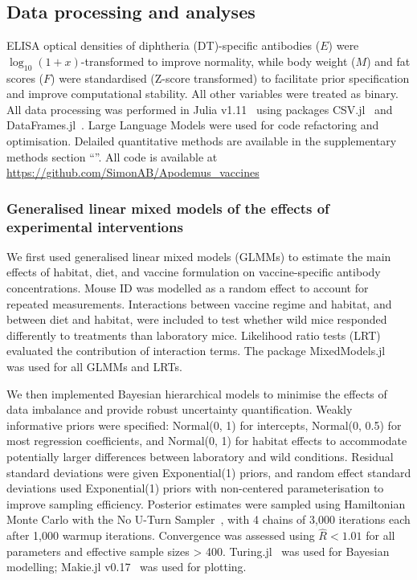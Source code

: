 \documentclass[a4paper, hidelinks, 11pt]{article}
\begin{document}
\subsection{Data processing and analyses}

ELISA optical densities of diphtheria (DT)-specific antibodies ($E$) were $\log_{10}(1 + x)$-transformed to improve normality, while body weight ($M$) and fat scores ($F$) were standardised (Z-score transformed) to facilitate prior specification and improve computational stability. All other variables were treated as binary. All data processing was performed in Julia v1.11~\cite{Bezanson2017} using packages CSV.jl~\cite{CSV2022} and DataFrames.jl~\cite{DataFrames2022}. Large Language Models were used for code refactoring and optimisation. Delailed quantitative methods are available in the supplementary methods section ``''. All code is available at \url{https://github.com/SimonAB/Apodemus_vaccines}

\subsubsection{Generalised linear mixed models of the effects of experimental interventions}\label{sec:GLMM}

We first used generalised linear mixed models (GLMMs) to estimate the main effects of habitat, diet, and vaccine formulation on vaccine-specific antibody concentrations. Mouse ID was modelled as a random effect to account for repeated measurements. Interactions between vaccine regime and habitat, and between diet and habitat, were included to test whether wild mice responded differently to treatments than laboratory mice. Likelihood ratio tests (LRT) evaluated the contribution of interaction terms. The package MixedModels.jl~\cite{douglas_bates_2022} was used for all GLMMs and LRTs.

We then implemented Bayesian hierarchical models to minimise the effects of data imbalance and provide robust uncertainty quantification. Weakly informative priors were specified: Normal(0, 1) for intercepts, Normal(0, 0.5) for most regression coefficients, and Normal(0, 1) for habitat effects to accommodate potentially larger differences between laboratory and wild conditions. Residual standard deviations were given Exponential(1) priors, and random effect standard deviations used Exponential(1) priors with non-centered parameterisation to improve sampling efficiency. Posterior estimates were sampled using Hamiltonian Monte Carlo with the No U-Turn Sampler~\cite{Hoffman2014}, with 4 chains of 3,000 iterations each after 1,000 warmup iterations. Convergence was assessed using $\hat{R} < 1.01$ for all parameters and effective sample sizes > 400. Turing.jl~\cite{ge2018t} was used for Bayesian modelling; Makie.jl v0.17~\cite{Danisch2021} was used for plotting.
\end{document}
